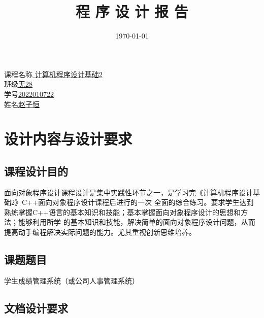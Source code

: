 \documentclass[fontset=windows]{article}
\title{\heiti\zihao{0}程{ }序{ }设{ }计{ }报{ }告}
\author{}
\date{}
\begin{document}
\maketitle
\begin{center}
\songti{}课程名称\underline{{ }{ }{ }计算机程序设计基础2{ }{ }{ }}
\\
\vspace{8cm}   
\songti{}班\hspace{1.128cm}级\underline{\hspace{2.7cm}无28\hspace{2.7cm}}
\\
\songti{}学\hspace{1.128cm}号\underline{\hspace{1.87cm}2022010722\hspace{1.87cm}}
\\
\songti{}姓\hspace{1.128cm}名\underline{\hspace{2.4cm}赵子恒\hspace{2.4cm}}
\\
\vspace{3cm}
\date{\today}
\vfill
\newpage
\end{center}




\tableofcontents
\newpage
\section{设计内容与设计要求}
\subsection{课程设计目的}
面向对象程序设计课程设计是集中实践性环节之一，是学习完《计算机程序设计基础2》C++面向对象程序设计课程后进行的一次
全面的综合练习。要求学生达到熟练掌握C++语言的基本知识和技能；基本掌握面向对象程序设计的思想和方法；能够利用所学
的基本知识和技能，解决简单的面向对象程序设计问题，从而提高动手编程解决实际问题的能力。尤其重视创新思维培养。
\subsection{课题题目}
学生成绩管理系统（或公司人事管理系统）
\subsection{文档设计要求}
\end{document}
